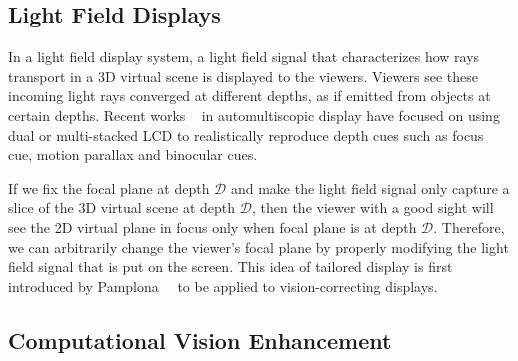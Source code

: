 \subsection{Light Field Displays}
In a light field display system, a light field signal that characterizes how rays transport in a 3D virtual scene is displayed to the viewers. Viewers see these incoming light rays converged at different depths, as if emitted from objects at certain depths. Recent works ~\cite{ranieri2012multi,wetzstein2012tensor,maimone2013focus} in automultiscopic display have focused on using dual or multi-stacked LCD to realistically reproduce depth cues such as focus cue, motion parallax and binocular cues.

If we fix the focal plane at depth $\mathcal{D}$ and make the light field signal only capture a slice of the 3D virtual scene at depth $\mathcal{D}$, then the viewer with a good sight will see the 2D virtual plane in focus only when focal plane is at depth $\mathcal{D}$. Therefore, we can arbitrarily change the viewer's focal plane by properly modifying the light field signal that is put on the screen. This idea of tailored display is first introduced by Pamplona~\etal~\cite{pamplona12} to be applied to vision-correcting displays.

\subsection{Computational Vision Enhancement}


